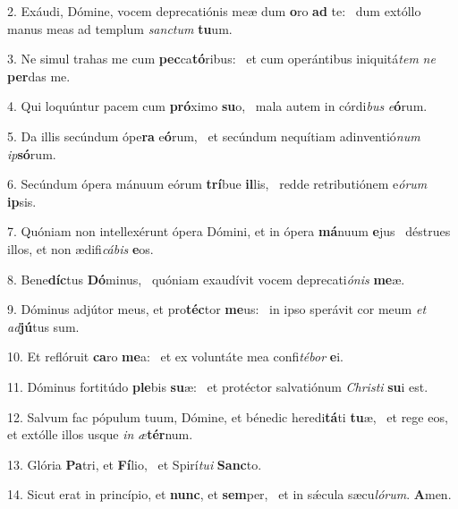 2. Exáudi, Dómine, vocem deprecatiónis meæ dum \textbf{o}ro \textbf{ad} te: \ast\  dum extóllo manus meas ad templum \textit{sanc}\textit{tum} \textbf{tu}um.\

3. Ne simul trahas me cum \textbf{pec}ca\textbf{tó}ribus: \ast\  et cum operántibus iniquitá\textit{tem} \textit{ne} \textbf{per}das me.\

4. Qui loquúntur pacem cum \textbf{pró}ximo \textbf{su}o, \ast\  mala autem in córdi\textit{bus} \textit{e}\textbf{ó}rum.\

5. Da illis secúndum ópe\textbf{ra} e\textbf{ó}rum, \ast\  et secúndum nequítiam adinventió\textit{num} \textit{ip}\textbf{só}rum.\

6. Secúndum ópera mánuum eórum \textbf{trí}bue \textbf{il}lis, \ast\  redde retributiónem e\textit{ó}\textit{rum} \textbf{ip}sis.\

7. Quóniam non intellexérunt ópera Dómini, et in ópera \textbf{má}nuum \textbf{e}jus \ast\  déstrues illos, et non ædifi\textit{cá}\textit{bis} \textbf{e}os.\

8. Bene\textbf{díc}tus \textbf{Dó}minus, \ast\  quóniam exaudívit vocem deprecati\textit{ó}\textit{nis} \textbf{me}æ.\

9. Dóminus adjútor meus, et pro\textbf{téc}tor \textbf{me}us: \ast\  in ipso sperávit cor meum \textit{et} \textit{ad}\textbf{jú}tus sum.\

10. Et reflóruit \textbf{ca}ro \textbf{me}a: \ast\  et ex voluntáte mea confi\textit{té}\textit{bor} \textbf{e}i.\

11. Dóminus fortitúdo \textbf{ple}bis \textbf{su}æ: \ast\  et protéctor salvatiónum \textit{Chris}\textit{ti} \textbf{su}i est.\

12. Salvum fac pópulum tuum, Dómine, et bénedic heredi\textbf{tá}ti \textbf{tu}æ, \ast\  et rege eos, et extólle illos usque \textit{in} \textit{æ}\textbf{tér}num.\

13. Glória \textbf{Pa}tri, et \textbf{Fí}lio, \ast\  et Spirí\textit{tu}\textit{i} \textbf{Sanc}to.\

14. Sicut erat in princípio, et \textbf{nunc}, et \textbf{sem}per, \ast\  et in sǽcula sæcu\textit{ló}\textit{rum}. \textbf{A}men.\

